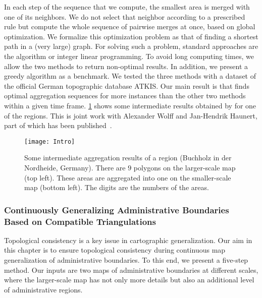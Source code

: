 In each step of the sequence that we compute, 
the smallest area is merged with one of its neighbors. 
We do not select that neighbor according to a prescribed rule 
but compute the whole sequence of pairwise merges at once, 
based on global optimization.
We formalize this optimization problem as that of 
finding a shortest path in a (very large) graph.
For solving such a problem, standard approaches
are the \Astar algorithm or integer linear programming.
To avoid long computing times, we allow the two methods to 
return non-optimal results.
In addition, we present a greedy algorithm 
as a benchmark.
We tested the three methods with a
dataset of the official German topographic database ATKIS.
Our main result is that
\Astar finds optimal aggregation sequences for more instances 
than the other two methods
within a given time frame.
\fig\ref{fig:Intro_AreaAgg_Case612} shows some intermediate 
results obtained by \Astar for one of the regions.
This is joint work with Alexander Wolff and Jan-Hendrik Haunert,
part of which has been published~\parencite[see][]{Peng2017AStar}.


\begin{figure}[tb]
\centering
\texttt{[image: Intro]}
\caption{Some intermediate aggregation results of 
	a region (Buchholz in der Nordheide, Germany). 
	There are $9$ polygons on 
	the larger-scale map (top left). 
	These areas are aggregated into one 
	on the smaller-scale map (bottom left). 
	The digits are the numbers of the areas.
}
\label{fig:Intro_AreaAgg_Case612}
\end{figure}

\subsubsection{%
Continuously Generalizing Administrative Boundaries\\
Based on Compatible Triangulations}

Topological consistency is a key issue 
in cartographic generalization.
Our aim in this chapter is to ensure topological consistency  
during continuous map generalization 
of administrative boundaries.
To this end, we present a five-step method.
Our inputs are two maps of administrative boundaries 
at different scales, 
where the larger-scale map has not only more details 
but also an additional level of administrative regions.

